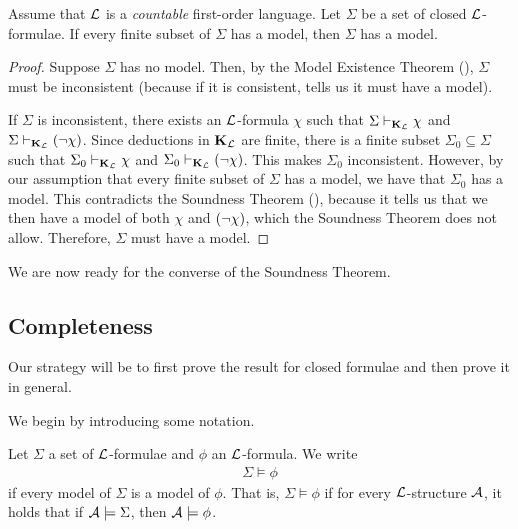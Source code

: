 \begin{boxtheorem}\label{Ch2:Thm:Compactness}
    Assume that $\mathcal{L}$ is a \textit{countable} first-order language. Let $\Sigma$ be a set of closed $\mathcal{L}$-formulae. If every finite subset of $\Sigma$ has a model, then $\Sigma$ has a model.
\end{boxtheorem}
\begin{proof}
    Suppose $\Sigma$ has no model. Then, by the Model Existence Theorem (), $\Sigma$ must be inconsistent (because if it is consistent,  tells us it must have a model).
    
    If $\Sigma$ is inconsistent, there exists an $\mathcal{L}$-formula $\chi$ such that $\Sigma \vdash_{\mathbf{K}_{\mathcal{L}}} \chi$ and $\Sigma \vdash_{\mathbf{K}_{\mathcal{L}}} \left( \neg \chi \right)$. Since deductions in $\mathbf{K}_{\mathcal{L}}$ are finite, there is a finite subset $\Sigma_{0} \subseteq \Sigma$ such that $\Sigma_{0} \vdash_{\mathbf{K}_{\mathcal{L}}} \chi$ and $\Sigma_0 \vdash_{\mathbf{K}_{\mathcal{L}}} \left( \neg \chi \right)$. This makes $\Sigma_0$ inconsistent. However, by our assumption that every finite subset of $\Sigma$ has a model, we have that $\Sigma_0$ has a model. This contradicts the Soundness Theorem (), because it tells us that we then have a model of both $\chi$ and $\left( \neg \chi \right)$, which the Soundness Theorem does not allow. Therefore, $\Sigma$ must have a model.
\end{proof}

We are now ready for the converse of the Soundness Theorem.

\subsection{Completeness}

Our strategy will be to first prove the result for closed formulae and then prove it in general.

We begin by introducing some notation.

\begin{boxconvention}
    Let $\Sigma$ a set of $\mathcal{L}$-formulae and $\phi$ an $\mathcal{L}$-formula. We write
    \begin{align*}
        \Sigma \models \phi
    \end{align*}
    if every model of $\Sigma$ is a model of $\phi$. That is, $\Sigma \models \phi$ if for every $\mathcal{L}$-structure $\mathcal{A}$, it holds that if $\mathcal{A} \models \Sigma$, then $\mathcal{A} \models \phi$.
\end{boxconvention}

